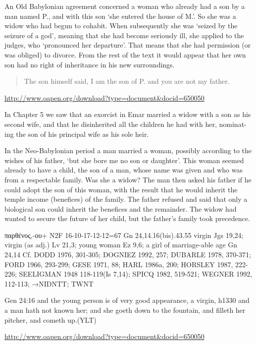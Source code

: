 \documentclass[11pt]{article}
\begin{document}
\medskip
\begin{thebibliography}{56}
An Old Babylonian agreement concerned a woman who already had a son by a man named P., and with this son `she entered the house of M.'. So she was a widow who had begun to cohabit. When subsequently she was `seized by the seizure of a god', meaning that she had become seriously ill, she applied to the judges, who `pronounced her departure'. That means that she had permission (or
was obliged) to divorce. From the rest of the text it would appear that her own son had no right of inheritance in his new surroundings. 

\begin{quote}
The son himself said, I am the son of P. and you are not my father.
\end{quote}
\url{http://www.oapen.org/download?type=document&docid=650050}


In Chapter 5 we saw that an exorcist in Emar married a widow with a son as his
second wife, and that he disinherited all the children he had with her, nominat-
ing the son of his principal wife as his sole heir.

     In the Neo-Babylonian period a man married a woman, possibly according
to the wishes of his father, `but she bore me no son or daughter'. This woman
seemed already to have a child, the son of a man, whose name was given and
who was from a respectable family. Was she a widow? The man then asked his
father if he could adopt the son of this woman, with the result that he would
inherit the temple income (benefices) of the family. The father refused and said
that only a biological son could inherit the benefices and the remainder. The
widow had wanted to secure the future of her child, but the father's family took
precedence.


παρθένος,-ου+ N2F 16-10-17-12-12=67
Gn 24,14.16(bis).43.55
virgin Jgs 19,24; virgin (as adj.) Lv 21,3; young woman Ez 9,6; a girl of marriage-able age Gn 24,14
Cf. DODD 1976, 301-305; DOGNIEZ 1992, 257; DUBARLE 1978, 370-371; FORD 1966, 293-299; GESE
1971, 88; HARL 1986a, 200; HORSLEY 1987, 222-226; SEELIGMAN 1948 118-119(Is 7,14); SPICQ 1982,
519-521; WEGNER 1992, 112-113; →NIDNTT; TWNT 

Gen 24:16
and the young person is of very good appearance, a virgin, h1330 and a man hath not known her; and she goeth down to the fountain, and filleth her pitcher, and cometh up.(YLT)



\url{http://www.oapen.org/download?type=document&docid=650050}
\end{thebibliography}
\end{document}
